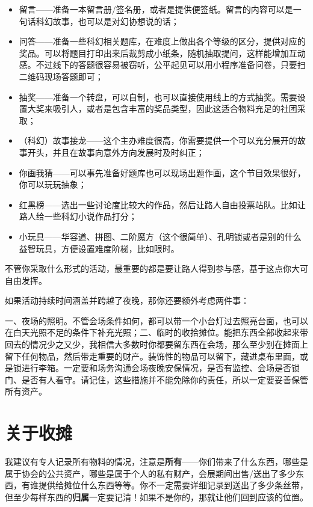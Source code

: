 \begin{itemize}
\tightlist
\item
  留言------准备一本留言册/签名册，或者是提供便签纸。留言的内容可以是一句话科幻故事，也可以是对幻协想说的话；
\item
  问答------准备一些科幻相关题库，在难度上做出各个等级的区分，提供对应的奖品。可以将题目打印出来后裁剪成小纸条，随机抽取提问，这样能增加互动感。不过线下的答题很容易被窃听，公平起见可以用小程序准备问卷，只要扫二维码现场答题即可；
\item
  抽奖------准备一个转盘，可以自制，也可以直接使用线上的方式抽奖。需要设置大奖来吸引人，或者是包含丰富的奖品类型，因此这适合物料充足的社团采取；
\item
  （科幻）故事接龙------这个主办难度很高，你需要提供一个可以充分展开的故事开头，并且在故事向意外方向发展时及时纠正；
\item
  你画我猜------可以事先准备好题库也可以现场出题作画，这个节目效果很好，你可以玩玩抽象；
\item
  红黑榜------选出一些讨论度比较大的作品，然后让路人自由投票站队。比如让路人给一些科幻小说作品打分；
\item
  小玩具------华容道、拼图、二阶魔方（这个很简单）、孔明锁或者是别的什么益智玩具，方便设置难度阶梯，比如限时。
\end{itemize}

不管你采取什么形式的活动，最重要的都是要让路人得到参与感，基于这点你大可自由发挥。

如果活动持续时间涵盖并跨越了夜晚，那你还要额外考虑两件事：

一、夜场的照明。不管会场条件如何，都可以带一个小台灯过去照亮台面，也可以在白天光照不足的条件下补充光照；二、临时的收拾摊位。能把东西全部收起来带回去的情况少之又少，我相信大多数时你都要留东西在会场，那么至少别在摊面上留下任何物品，然后带走重要的财产。装饰性的物品可以留下，藏进桌布里面，或是锁进行李箱。一定要和场务沟通会场夜晚安保情况，是否有监控、会场是否锁门、是否有人看守。请记住，这些措施并不能免除你的责任，所以一定要妥善保管所有资产。

\section{关于收摊}\label{ux5173ux4e8eux6536ux644a}

我建议有专人记录所有物料的情况，注意是\textbf{所有}------你们带来了什么东西，哪些是属于协会的公共资产，哪些是属于个人的私有财产，会展期间出售/送出了多少东西，有谁提供给摊位什么东西等等。你不一定需要详细记录到送出了多少条丝带，但至少每样东西的\textbf{归属}一定要记清！如果不是你的，那就让他们回到应该的位置。

